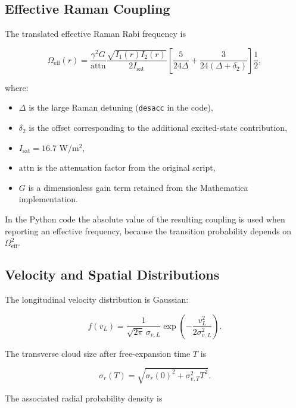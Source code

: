 \documentclass[11pt,a4paper]{article}
\begin{document}
\subsection{Effective Raman Coupling}

The translated effective Raman Rabi frequency is

\begin{equation}
\Omega_{\mathrm{eff}}(r)
=
\frac{\gamma^2 G}{\mathrm{attn}}
\frac{\sqrt{I_1(r)I_2(r)}}{2I_{\mathrm{sat}}}
\left[
\frac{5}{24\Delta} + \frac{3}{24(\Delta+\delta_2)}
\right]\frac{1}{2},
\end{equation}

where:

\begin{itemize}
  \item $\Delta$ is the large Raman detuning (\texttt{desacc} in the code),
  \item $\delta_2$ is the offset corresponding to the additional excited-state contribution,
  \item $I_{\mathrm{sat}} = 16.7$ W/m$^2$,
  \item $\mathrm{attn}$ is the attenuation factor from the original script,
  \item $G$ is a dimensionless gain term retained from the Mathematica implementation.
\end{itemize}

In the Python code the absolute value of the resulting coupling is used when reporting an effective
frequency, because the transition probability depends on $\Omega_{\mathrm{eff}}^2$.

\subsection{Velocity and Spatial Distributions}

The longitudinal velocity distribution is Gaussian:

\begin{equation}
f(v_L) = \frac{1}{\sqrt{2\pi}\,\sigma_{v,L}}
\exp\!\left(-\frac{v_L^2}{2\sigma_{v,L}^2}\right).
\end{equation}

The transverse cloud size after free-expansion time $T$ is

\begin{equation}
\sigma_r(T) = \sqrt{\sigma_r(0)^2 + \sigma_{v,T}^2 T^2}.
\end{equation}

The associated radial probability density is
\end{document}
